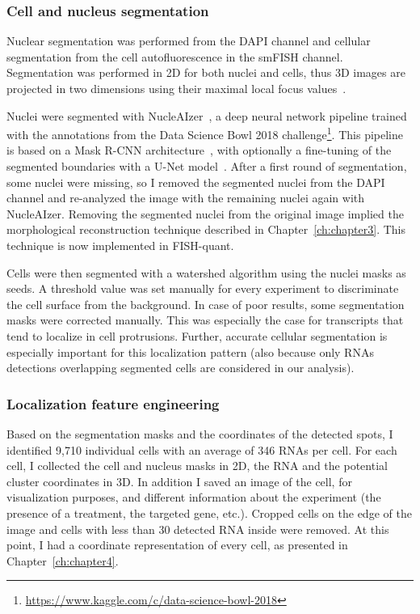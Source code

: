 \subsubsection{Cell and nucleus segmentation}

Nuclear segmentation was performed from the DAPI channel and cellular segmentation from the cell autofluorescence in the \ac{smFISH} channel.
Segmentation was performed in 2D for both nuclei and cells, thus 3D images are projected in two dimensions using their maximal local focus values~\cite{tsanov_smifish_2016}.

Nuclei were segmented with NucleAIzer~\cite{hollandi_nucleaizer_2020}, a deep neural network pipeline trained with the annotations from the Data Science Bowl 2018 challenge\footnote{\url{https://www.kaggle.com/c/data-science-bowl-2018}}.
This pipeline is based on a Mask R-CNN architecture~\cite{He_2017_ICCV}, with optionally a fine-tuning of the segmented boundaries with a U-Net model~\cite{Ronneberger_unet}.
After a first round of segmentation, some nuclei were missing, so I removed the segmented nuclei from the DAPI channel and re-analyzed the image with the remaining nuclei again with NucleAIzer.
Removing the segmented nuclei from the original image implied the morphological reconstruction technique described in Chapter~\ref{ch:chapter3}.
This technique is now implemented in FISH-quant.

Cells were then segmented with a watershed algorithm using the nuclei masks as seeds.
A threshold value was set manually for every experiment to discriminate the cell surface from the background.
In case of poor results, some segmentation masks were corrected manually.
This was especially the case for transcripts that tend to localize in cell protrusions.
Further, accurate cellular segmentation is especially important for this localization pattern (also because only RNAs detections overlapping segmented cells are considered in our analysis).

\subsubsection{Localization feature engineering}

Based on the segmentation masks and the coordinates of the detected spots, I identified 9,710 individual cells with an average of 346 \ac{RNA}s per cell.
For each cell, I collected the cell and nucleus masks in 2D, the \ac{RNA} and the potential cluster coordinates in 3D.
In addition I saved an image of the cell, for visualization purposes, and different information about the experiment (the presence of a treatment, the targeted gene, etc.).
Cropped cells on the edge of the image and cells with less than 30 detected \ac{RNA} inside were removed.
At this point, I had a coordinate representation of every cell, as presented in Chapter~\ref{ch:chapter4}.

